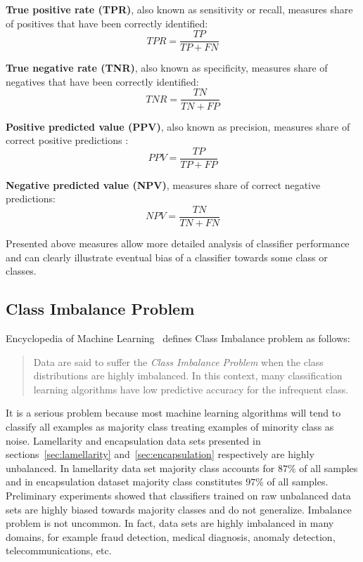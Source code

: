 \documentclass[a4paper, 11pt, table]{article}
\begin{document}
\textbf{True positive rate (TPR)}, also known as sensitivity or recall, measures share of positives that have been correctly identified:
\begin{equation*}
TPR = \frac{TP}{TP + FN}
\end{equation*}

\textbf{True negative rate (TNR)}, also known as specificity, measures share of negatives that have been correctly identified:
\begin{equation*}
TNR = \frac{TN}{TN + FP}
\end{equation*}

\textbf{Positive predicted value (PPV)}, also known as precision, measures share of correct positive predictions :
\begin{equation*}
PPV = \frac{TP}{TP + FP}
\end{equation*}

\textbf{Negative predicted value (NPV)}, measures share of correct negative predictions:
\begin{equation*}
NPV = \frac{TN}{TN + FN}
\end{equation*}

Presented above measures allow more detailed analysis of classifier performance and can clearly illustrate eventual bias of a classifier towards some class or classes. 

\subsection{Class Imbalance Problem}
\label{sec:class_imbalance}
Encyclopedia of Machine Learning~\cite{Ling2010} defines Class Imbalance problem as follows:
\blockquote{Data are said to suffer the \textit{Class Imbalance Problem} when the class distributions are highly imbalanced. In this context, many classification learning algorithms have low predictive accuracy for the infrequent class.}

It is a serious problem because most machine learning algorithms will tend to classify all examples as majority class treating examples of minority class as noise. Lamellarity and encapsulation data sets presented in sections~\ref{sec:lamellarity} and~\ref{sec:encapsulation} respectively are highly unbalanced. In lamellarity data set majority class accounts for $87\%$ of all samples and in encapsulation dataset majority class constitutes $97\%$ of all samples. Preliminary experiments showed that classifiers trained on raw unbalanced data sets are highly biased towards majority classes and do not generalize. Imbalance problem is not uncommon. In fact, data sets are highly imbalanced in many domains, for example fraud detection, medical diagnosis, anomaly detection, telecommunications, etc. 
\end{document}
